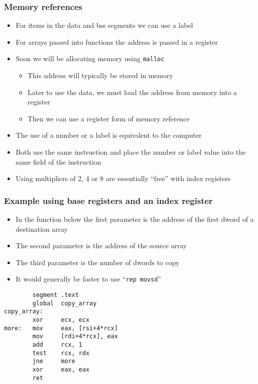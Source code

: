 \documentclass{beamer}
\begin{document}
\begin{frame}
    \frametitle{Memory references}
    \begin{itemize}
        \item For items in the data and bss segments we can use a label
        \item For arrays passed into functions the address is passed in a register
        \item Soon we will be allocating memory using {\tt malloc}
        \begin{itemize}
            \item This address will typically be stored in memory
            \item Later to use the data, we must load the address from memory
                  into a register
            \item Then we can use a register form of memory reference
        \end{itemize}
        \item The use of a number or a label is equivalent to the computer
        \item Both use the same instruction and place the number or label value
              into the same field of the instruction
        \item Using multipliers of 2, 4 or 8 are essentially ``free'' with index
              registers
    \end{itemize}
\end{frame}

\begin{frame}[fragile]
    \frametitle{Example using base registers and an index register}
    \begin{itemize}
        \item In the function below the first parameter is the address of
              the first dword of a destination array
        \item The second parameter is the address of the source array
        \item The third parameter is the number of dwords to copy
        \item It would generally be faster to use ``{\tt rep movsd}''
    \end{itemize}

\begin{verbatim}
        segment .text
        global  copy_array
copy_array:
        xor     ecx, ecx
more:   mov     eax, [rsi+4*rcx]
        mov     [rdi+4*rcx], eax
        add     rcx, 1
        test    rcx, rdx
        jne     more
        xor     eax, eax
        ret
\end{verbatim}
\end{frame}
\end{document}
